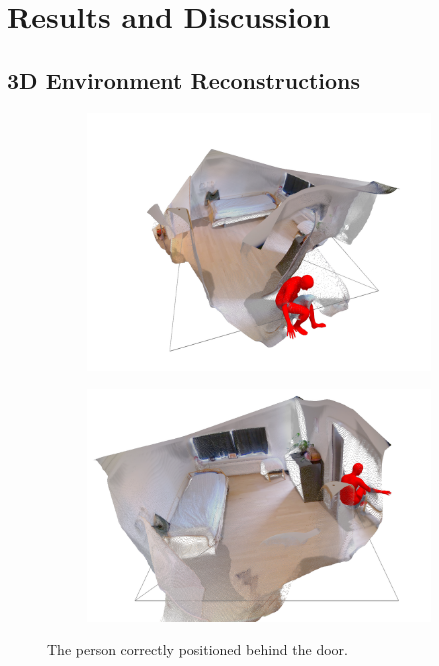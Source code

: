 \chapter{Results and Discussion}
\section*{3D Environment Reconstructions}
\begin{figure}[H]
    \centering
    \begin{subfigure}[b]{0.49\linewidth}
        \includegraphics[width=\linewidth]{figures/results/room2.png}
    \end{subfigure}
    \hfill
    \begin{subfigure}[b]{0.49\linewidth}
        \includegraphics[width=\linewidth]{figures/results/room1.png}
    \end{subfigure}
    \caption{The person correctly positioned behind the door.}
    \label{fig:room1}
\end{figure}

